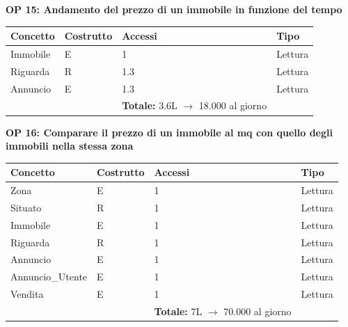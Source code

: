 \documentclass[a4paper,12pt]{report}
\begin{document}
             \textbf{OP 15: Andamento del prezzo di un immobile in funzione del tempo}
        	\begin{table}[H]
            \centering
             \begin{tabular}{llll}
             \rowcolor{yellow!20} \textbf{Concetto} & \textbf{Costrutto} & \textbf{Accessi} & \textbf{Tipo}\\ [0.5ex] 
             \hline
             Immobile & E & 1 & Lettura \\ 
             Riguarda & R & 1.3 & Lettura \\ 
             Annuncio & E & 1.3 & Lettura \\ 
             \hline
                \rowcolor{yellow!20} &   & \textbf{Totale:} 3.6L $\rightarrow$ 18.000 al giorno &  \\ [1ex] 
             
             \end{tabular}
            \end{table}

            \textbf{OP 16: Comparare il prezzo di un immobile al mq con quello degli immobili nella stessa zona}
        	\begin{table}[H]
            \centering
             \begin{tabular}{llll}
             \rowcolor{yellow!20} \textbf{Concetto} & \textbf{Costrutto} & \textbf{Accessi} & \textbf{Tipo}\\ [0.5ex] 
             \hline
             Zona & E & 1 & Lettura \\ 
             Situato & R & 1 & Lettura \\ 
             Immobile & E & 1 & Lettura \\ 
             Riguarda & R & 1 & Lettura \\ 
             Annuncio & E & 1 & Lettura \\ 
             Annuncio\_Utente & E & 1 & Lettura \\ 
             Vendita & E & 1 & Lettura \\ 
             \hline
                \rowcolor{yellow!20} &   & \textbf{Totale:} 7L $\rightarrow$ 70.000 al giorno &  \\ [1ex] 
             
             \end{tabular}
            \end{table}
\end{document}
